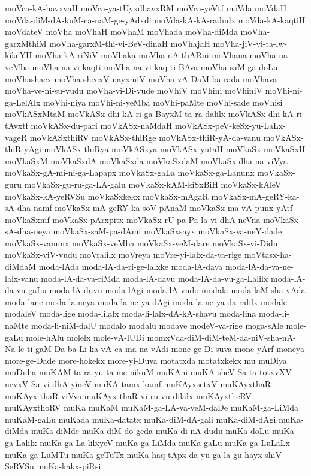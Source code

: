 {moVca-kA-havxyaH
moVca-ya-tUyxdhavxRM
moVca-yeVtf
moVda
moVdaH
moVda-diM-dA-kuM-ca-naM-ge-yAdxdi
moVda-kA-kA-radudx
moVda-kA-kaqtiH
moVdateV
moVha
moVhaH
moVhaM
moVhada
moVha-diMda
moVha-garxMthiM
moVha-garxM-thi-vi-BeV-dinaH
moVhajaH
moVha-jiV-vi-ta-lw-kikeYH
moVha-kA-riNiV
moVhaka
moVha-nA-thARni
moVhana
moVha-na-veMba
moVha-na-vi-kaqti
moVha-na-vi-kaq-ti-BAva
moVha-saM-ga-doLu
moVhashacx
moVha-shecxV-nayxmiV
moVha-vA-DaM-ba-rada
moVhava
moVha-ve-ni-su-vudu
moVha-vi-Di-vude
moVhiV
moVhini
moVhiniV
moVhi-ni-ga-LelAlx
moVhi-niya
moVhi-ni-yeMba
moVhi-paMte
moVhi-sade
moVhisi
moVkASxMtaM
moVkASx-dhi-kA-ri-ga-BayxM-ta-ra-dalilx
moVkASx-dhi-kA-ri-tAvxtf
moVkASx-du-pari
moVkASx-naMdaH
moVkASx-peV-keSx-yu-LaLx-vageR
moVkASxthiRV
moVkASx-thiRge
moVkASx-thiR-yA-da-vanu
moVkASx-thiR-yAgi
moVkASx-thiRya
moVkASxya
moVkASx-yutaH
moVkaSx
moVkaSxH
moVkaSxM
moVkaSxdA
moVkaSxda
moVkaSxdaM
moVkaSx-dha-na-viVya
moVkaSx-gA-mi-ni-ga-Lapapx
moVkaSx-gaLa
moVkaSx-ga-Lanunx
moVkaSx-guru
moVkaSx-gu-ru-ga-LA-galu
moVkaSx-kAM-kiSxBiH
moVkaSx-kAleV
moVkaSx-kA-yeRVSu
moVkaSxkekx
moVkaSx-mAgaR
moVkaSx-mA-geRY-ka-sA-dha-namf
moVkaSx-mA-geRY-ka-soV-pAnaM
moVkaSx-ma-vA-punx-yAtf
moVkaSxmf
moVkaSx-pArxpitx
moVkaSx-rU-pa-Pa-la-vi-dhA-neVna
moVkaSx-sA-dha-neya
moVkaSx-saM-pa-dAmf
moVkaSxsayx
moVkaSx-va-neY-dade
moVkaSx-vanunx
moVkaSx-veMba
moVkaSx-veM-dare
moVkaSx-vi-Didu
moVkaSx-viV-vudu
moVralilx
moVreya
moVre-yi-lalx-da-va-rige
moVtasx-ha-diMdaM
moda-lAda
moda-lA-da-ri-ge-lalxke
moda-lA-dava
moda-lA-da-va-ne-lalx-vanu
moda-lA-da-va-riMda
moda-lA-davu
moda-lA-da-vu-ga-Lalilx
moda-lA-da-vu-gaLu
moda-lA-duvu
moda-lAgi
moda-lA-vudo
modala
moda-laM-sha-vAda
moda-lane
moda-la-neya
moda-la-ne-ya-dAgi
moda-la-ne-ya-da-ralilx
modale
modaleV
moda-lige
moda-lilalx
moda-li-lalx-dA-kA-shavu
moda-lina
moda-li-naMte
moda-li-niM-dalU
modalo
modalu
modave
modeV-va-rige
moga-sAle
mole-gaLu
mole-hAlu
molelx
mole-vA-lUDi
momxVda-diM-diM-teM-da-niV-sha-nA-Na-le-ti-gaM-Da-ba-Li-ka-vA-ca-ma-na-vAdi
mone-ge-Di-suva
mone-yArf
moneya
more-ge-Dade
more-hokekx
more-yi-Duva
motatxda
motatxkekx
mu
muDiya
muDuha
muKAM-ta-ra-yu-ta-me-nikuM
muKAni
muKA-sheV-Sa-ta-totxvXV-nevxV-Sa-vi-dhA-yineV
muKA-tamx-kamf
muKAyxsetxV
muKAyxthaR
muKAyx-thaR-viVva
muKAyx-thaR-vi-ru-vu-dilalx
muKAyxtheRV
muKAyxthoRV
muKa
muKaM
muKaM-ga-LA-va-veM-daDe
muKaM-ga-LiMda
muKaM-gaLu
muKada
muKa-datatx
muKa-diM-dA-gali
muKa-diM-dAgi
muKa-diMda
muKa-diMde
muKa-diM-do-geda
muKa-di-nA-dudu
muKa-doLu
muKa-ga-Lalilx
muKa-ga-La-lilxyeV
muKa-ga-LiMda
muKa-gaLu
muKa-ga-LuLaLx
muKa-ga-LuMTu
muKa-geTuTx
muKa-haq-tApx-da-yu-ga-la-gu-hayx-shiV-SeRVSu
muKa-kakx-piRsi
}
